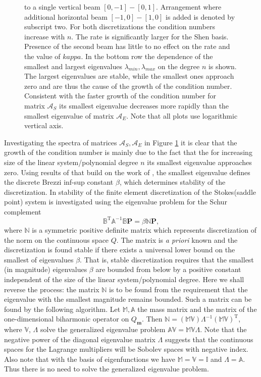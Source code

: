 \documentclass{marine_2015}
\newcommand{\Amat}{\ensuremath{\mathbb{A}}}
\newcommand{\Bmat}{\ensuremath{\mathbb{B}}}
\newcommand{\Pvec}{\ensuremath{\mathbf{P}}}
\newcommand{\Qh}{\ensuremath{Q_{\mathbf{m}}}}
\begin{document}
\begin{figure}[t!]
{ to a single vertical beam $\left[0, -1\right]-\left[0, 1\right]$. Arrangement 
 where additional horizontal beam $\left[-1, 0\right]-\left[1, 0\right]$ is added 
 is denoted by subscript two. For both discretizations the condition numbers
 increase with $n$. The rate is significantly larger for the Shen basis. Presence 
 of the second beam has little to no effect on the rate and the value of $kappa$. 
 In the bottom row the dependence of the smallest and largest eigenvalues $\lambda_{min}, \lambda_{max}$ 
 on the degree $n$ is shown. The largest eigenvalues are stable, while the smallest 
 ones approach zero and are thus the cause of the growth of the condition number. 
 Consistent with the faster growth of the condition number for matrix $\mathcal{A}_S$ 
 its smallest eigenvalue decreases more rapidly than the smallest eigenvalue of 
 matrix $\mathcal{A}_E$. Note that all plots use logarithmic vertical axis.}
 \label{fig:no_precon}
 \end{figure}

Investigating the spectra of matrices $\mathcal{A}_S, \mathcal{A}_E$ in Figure 
\ref{fig:no_precon} it is clear that the growth of the condition number is mainly 
due to the fact that the for increasing size of the linear
system/polynomial degree $n$ its smallest eigenvalue approaches zero. Using results of 
\cite{marie} that build on the work of \cite{malkus}, the smallest eigenvalue defines 
the discrete Brezzi inf-sup constant $\beta$, which determines stability of the discretization. In \cite{marie} 
stability of the finite element discretization of the Stokes(saddle point) system 
is investigated using the eigenvalue problem for the Schur complement
\begin{equation}
  \label{eq:schur}
  \Bmat^{\text{T}}\Amat^{-1}\Bmat\Pvec = \beta\mathbb{N}\Pvec,
\end{equation}
where $\mathbb{N}$ is a symmetric positive definite matrix which
represents discretization of the norm on the continuous space $Q$. The matrix is
\textit{a priori} known and the discretization is found stable if there exists a
universal lower bound on the smallest of eigenvalues $\beta$. That is, stable
discretization requires that the smallest (in magnitude) eigenvalues $\beta$ are bounded from
below by a positive constant independent of the size of the linear system/polynomial
degree. Here we shall reverse the process: the matrix $\mathbb{N}$ is to be found 
from the requirement that the eigenvalue with the smallest magnitude remains bounded. 
Such a matrix can be found by the following algorithm. Let $\mathbb{M},
\mathbb{A}$ the mass matrix and the matrix of the one-dimensional biharmonic operator on $\Qh$.
Then
$\mathbb{N}=\left(\mathbb{M}\mathbb{V}\right){\Lambda}^{-1}\left(\mathbb{M}\mathbb{V}\right)^{\text{T}}$,
where $\mathbb{V}$, $\Lambda$ solve the generalized eigenvalue problem
$\mathbb{A}\mathbb{V}=\mathbb{M}\mathbb{V}\Lambda$. Note that the negative power 
of the diagonal eigenvalue matrix $\Lambda$ suggests that the continuous spaces 
for the Lagrange multipliers will be Sobolev spaces with negative index.
Also note that with the basis of eigenfunctions we have $\mathbb{M}=\mathbb{V}=\mathbb{I}$
and $\Lambda=\mathbb{A}$. Thus there is no need to solve the generalized
eigenvalue problem. 
\end{document}
